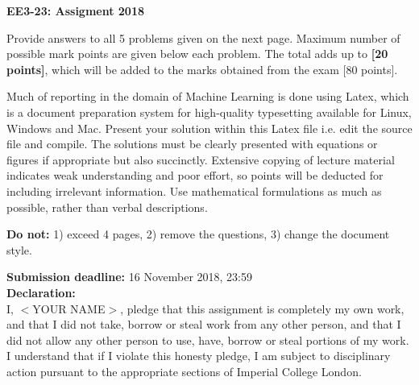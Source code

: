 \documentclass[11pt]{article}
\begin{document}
\bigskip
\bigskip

\begin{center}


\bigskip

{\Huge\textbf{EE3-23: Assigment 2018}} \\

\end{center}


Provide answers to all 5 problems given on the next page. Maximum number of possible mark points are given below each problem. The total adds up to  {\bf[20 points]}, which will be added to the marks obtained from the exam { [80 points]}.


 Much of reporting in the domain of Machine Learning is done using Latex, which is a document preparation system for high-quality typesetting available for Linux, Windows and Mac. Present your solution within this Latex file i.e. edit the source file and compile. The solutions must be clearly presented with equations or figures if appropriate but also succinctly.   Extensive copying of lecture material indicates weak understanding and poor effort, so points will be deducted for including irrelevant information. Use mathematical formulations as much as possible, rather than verbal descriptions. 
 
{\bf Do not:} 1) exceed { 4 pages}, 2) remove the questions, 3) change the document style. 

\bigskip
{\bf Submission deadline:} 16 November 2018, 23:59 \\

{\bf Declaration:}\\
I,	$<$YOUR NAME$>$, pledge that this assignment is completely my own work, and that I did not take, borrow or steal work from any other person, and that I did not allow any other person to use, have, borrow or steal portions of my work. I understand that if I violate this honesty pledge, I am subject to disciplinary action pursuant to the appropriate sections of Imperial College London.


\newpage






\end{document}
